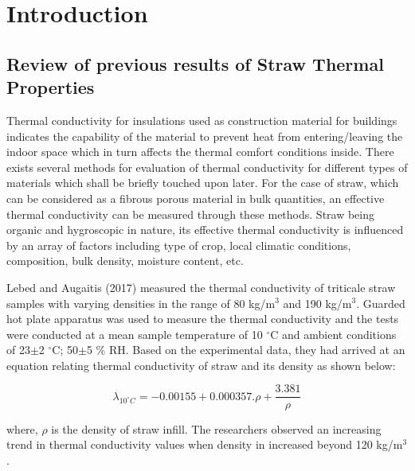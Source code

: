 \documentclass[12pt]{report}
\begin{document}


\section*{Introduction}

\subsection*{Review of previous results of Straw Thermal Properties}

Thermal conductivity for insulations used as construction material for
buildings indicates the capability of the material to prevent heat from
entering/leaving the indoor space which in turn affects the thermal
comfort conditions inside. There exists several methods for evaluation
of thermal conductivity for different types of materials which shall be
briefly touched upon later. For the case of straw, which can be
considered as a fibrous porous material in bulk quantities, an effective
thermal conductivity can be measured through these methods. Straw being
organic and hygroscopic in nature, its effective thermal conductivity is
influenced by an array of factors including type of crop, local climatic
conditions, composition, bulk density, moisture content, etc.

Lebed and Augaitis (2017) measured the thermal conductivity of
triticale straw samples with varying densities in the range of 80
kg/m\(^{3}\) and 190 kg/m\( ^{3}\). Guarded hot plate apparatus was used
to measure the thermal conductivity and the tests were conducted at a
mean sample temperature of 10 \(^{\circ}\)C and ambient conditions of
23\(\pm\)2 \(^{\circ}\)C; 50\(\pm\)5 \% RH. Based on the experimental
data, they had arrived at an equation relating thermal conductivity of
straw and its density as shown below:

\[\lambda_{10^{\circ}C} = -0.00155 + 0.000357.\rho  + \frac{3.381}{\rho}\]

where, \(\rho\) is the density of straw infill. The researchers observed
an increasing trend in thermal conductivity values when density in
increased beyond 120 kg/m\(^{3}\).
\end{document}
